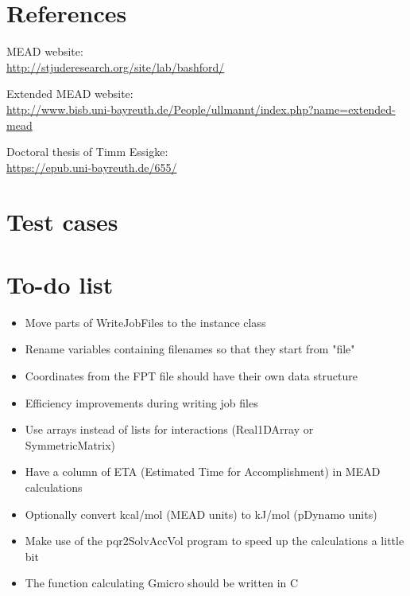 \documentclass[a4paper,11pt]{article}
\begin{document}



\section{References}
MEAD website: \\
\url{http://stjuderesearch.org/site/lab/bashford/}

Extended MEAD website:\\ 
\url{http://www.bisb.uni-bayreuth.de/People/ullmannt/index.php?name=extended-mead}

Doctoral thesis of Timm Essigke:\\
\url{https://epub.uni-bayreuth.de/655/}


\section{Test cases}


\section{To-do list}
\begin{itemize}
  \setlength{\itemsep}{2pt}
  \item Move parts of WriteJobFiles to the instance class
  \item Rename variables containing filenames so that they start from "file"
  \item Coordinates from the FPT file should have their own data structure
  \item Efficiency improvements during writing job files
  \item Use arrays instead of lists for interactions (Real1DArray or SymmetricMatrix)
  \item Have a column of ETA (Estimated Time for Accomplishment) in MEAD calculations
  \item Optionally convert kcal/mol (MEAD units) to kJ/mol (pDynamo units)
  \item Make use of the pqr2SolvAccVol program to speed up the calculations a little bit
  \item The function calculating Gmicro should be written in C
\end{itemize}
\end{document}
